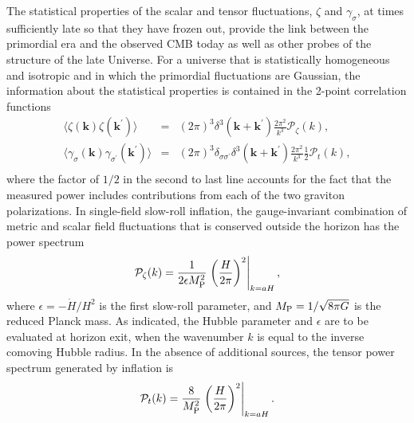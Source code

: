 The statistical properties of the scalar and tensor fluctuations, $\zeta$ and $\gamma_\sigma$, at times sufficiently late so that they have frozen out, provide the link between the primordial era and the observed CMB today as well as other probes of the structure of the late Universe. For a universe that is statistically homogeneous and isotropic and in which the primordial fluctuations are Gaussian, the information about the statistical properties is contained in the 2-point correlation functions
\begin{eqnarray}
\langle\zeta(\mathbf{k})\zeta(\mathbf{k}^{\prime})\rangle&=&(2\pi)^3\delta^3(\mathbf{k}+\mathbf{k}^{\prime})\frac{2\pi^2}{k^3}\mathcal{P}_{\zeta}(k),\nonumber\\
\langle\gamma_\sigma(\mathbf{k})\gamma_{\sigma^{\prime}}(\mathbf{k}^{\prime})\rangle&=&(2\pi)^3\delta_{\sigma\sigma^{\prime}}\delta^3(\mathbf{k}+\mathbf{k}^{\prime})\frac{2\pi^2}{k^3}\frac{1}{2}\mathcal{P}_{t}(k),\nonumber\\
\end{eqnarray}
where the factor of $1/2$ in the second to last line accounts for the fact that the measured power includes contributions from each of the two graviton polarizations. In single-field slow-roll inflation, the gauge-invariant combination of metric and scalar field fluctuations that is conserved outside the horizon has the power spectrum
\begin{equation}
\label{eq:inf_Pzeta}
\mathcal{P}_{\zeta}(k)=\frac{1}{2\epsilon M_{\rm P}^2}\left.\left(\frac{H}{2\pi}\right)^2\right|_{k=aH},
\end{equation}
where $\epsilon=-\dot{H}/H^2$ is the first slow-roll parameter, and $M_{\rm P}=1/\sqrt{8\pi G}$ is the reduced Planck mass. As indicated, the Hubble parameter and $\epsilon$ are to be evaluated at horizon exit, when the wavenumber $k$ is equal to the inverse comoving Hubble radius. In the absence of additional sources, the tensor power spectrum generated by inflation is
\begin{equation}
\label{eq:inf_Pt}
\mathcal{P}_{t}(k)=\frac{8}{M_{\rm P}^2}\left.\left(\frac{H}{2\pi}\right)^2\right|_{k=aH}.
\end{equation}

